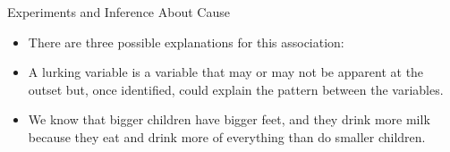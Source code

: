 \documentclass[handout]{beamer}
\begin{document}
\begin{frame}{Experiments and Inference About Cause}
\scriptsize{

\begin{itemize}
\item There are three possible explanations for this association:


 \item A lurking variable is a variable that may or may not be apparent at the outset but, once identified, could explain the pattern between the variables.

\item We know that bigger children have bigger feet, and they drink more milk because they eat and drink more of everything than do smaller children.


\end{itemize}



} 
\end{frame}
\end{document}
